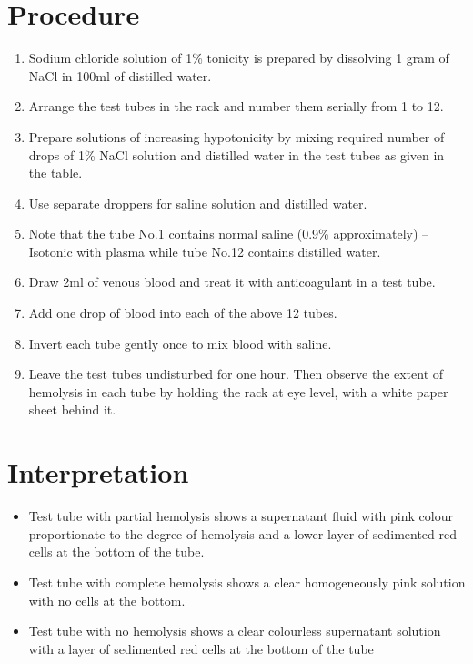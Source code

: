 \documentclass[a4paper,12pt,openany,twoside]{book}
\begin{document}
														\section*{Procedure}
														\begin{enumerate}
															\item{Sodium chloride solution of 1\% tonicity is prepared by dissolving 1 gram of NaCl in 100ml of distilled water.}
															\item{Arrange the test tubes in the rack and number them serially from 1 to 12.}
															\item{Prepare solutions of increasing hypotonicity by mixing required number of drops of 1\% NaCl solution and distilled water in the test tubes as given in the table.}
															\item{Use separate droppers for saline solution and distilled water.}
															\item{Note that the tube No.1 contains normal saline (0.9\% approximately) – Isotonic with plasma while tube No.12 contains distilled water.}
															\item{Draw 2ml of venous blood and treat it with anticoagulant in a test tube.}
															\item{Add one drop of blood into each of the above 12 tubes.}
															\item{Invert each tube gently once to mix blood with saline.}
															\item{Leave the test tubes undisturbed for one hour. Then observe the extent of hemolysis in each tube by holding the rack at eye level, with a white paper sheet behind it.}
														\end{enumerate}
															{\tiny {}}
														\section*{Interpretation}

														\begin{itemize}
															\item{Test tube with partial hemolysis shows a supernatant fluid with pink colour proportionate to the degree of hemolysis and a lower layer of sedimented red cells at the bottom of the tube.}
															\item{Test tube with complete hemolysis shows a clear homogeneously pink solution with no cells at the bottom.}
															\item{Test tube with no hemolysis shows a clear colourless supernatant solution with a layer of sedimented red cells at the bottom of the tube}
														\end{itemize}
\end{document}
